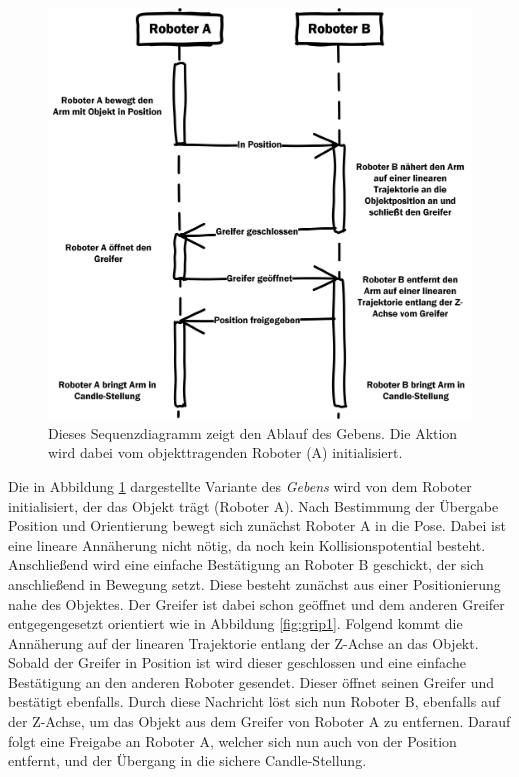 \begin{figure}
	\centering
	\includegraphics[scale=1.0]{fig/SeqGive}

	\caption[Sequenzdiagramm Geben]{Dieses Sequenzdiagramm zeigt den Ablauf des Gebens. Die Aktion wird dabei vom objekttragenden Roboter (A) initialisiert.}
		\label{fig:gripper1}
\end{figure}

Die in Abbildung \ref{fig:gripper1} dargestellte Variante des \textit{Gebens} wird von dem Roboter initialisiert, der das Objekt trägt (Roboter A). Nach Bestimmung der Übergabe Position und Orientierung bewegt sich zunächst Roboter A in die Pose. Dabei ist eine lineare Annäherung nicht nötig, da noch kein Kollisionspotential besteht. Anschließend wird eine einfache Bestätigung an Roboter B geschickt, der sich anschließend in Bewegung setzt. Diese besteht zunächst aus einer Positionierung nahe des Objektes. Der Greifer ist dabei schon geöffnet und dem anderen Greifer entgegengesetzt orientiert wie in Abbildung \ref{fig:grip1}. Folgend kommt die Annäherung auf der linearen Trajektorie entlang der Z-Achse an das Objekt. Sobald der Greifer in Position ist wird dieser geschlossen und eine einfache Bestätigung an den anderen Roboter gesendet. Dieser öffnet seinen Greifer und bestätigt ebenfalls. Durch diese Nachricht löst sich nun Roboter B, ebenfalls auf der Z-Achse, um das Objekt aus dem Greifer von Roboter A zu entfernen. Darauf folgt eine Freigabe an Roboter A, welcher sich nun auch von der Position entfernt, und der Übergang in die sichere Candle-Stellung.

